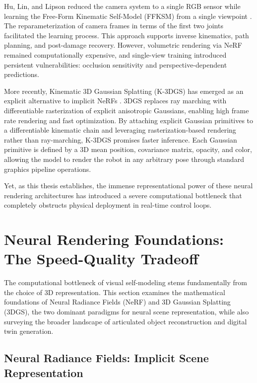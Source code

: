 \documentclass[12pt,a4paper,oneside]{report}
\begin{document}
Hu, Lin, and Lipson reduced the camera system to a single RGB sensor while learning the Free-Form Kinematic Self-Model (FFKSM) from a single viewpoint \cite{hu2024teaching}. The reparameterization of camera frames in terms of the first two joints facilitated the learning process. This approach supports inverse kinematics, path planning, and post-damage recovery. However, volumetric rendering via NeRF remained computationally expensive, and single-view training introduced persistent vulnerabilities: occlusion sensitivity and perspective-dependent predictions.

More recently, Kinematic 3D Gaussian Splatting (K-3DGS) has emerged as an explicit alternative to implicit NeRFs \cite{hu2025learning}. 3DGS replaces ray marching with differentiable rasterization of explicit anisotropic Gaussians, enabling high frame rate rendering and fast optimization. By attaching explicit Gaussian primitives to a differentiable kinematic chain and leveraging rasterization-based rendering rather than ray-marching, K-3DGS promises faster inference. Each Gaussian primitive is defined by a 3D mean position, covariance matrix, opacity, and color, allowing the model to render the robot in any arbitrary pose through standard graphics pipeline operations.

Yet, as this thesis establishes, the immense representational power of these neural rendering architectures has introduced a severe computational bottleneck that completely obstructs physical deployment in real-time control loops.

\section{Neural Rendering Foundations: The Speed-Quality Tradeoff}

The computational bottleneck of visual self-modeling stems fundamentally from the choice of 3D representation. This section examines the mathematical foundations of Neural Radiance Fields (NeRF) and 3D Gaussian Splatting (3DGS), the two dominant paradigms for neural scene representation, while also surveying the broader landscape of articulated object reconstruction and digital twin generation.

\subsection{Neural Radiance Fields: Implicit Scene Representation}
\label{subsec:neural_radiance_fields_implicit_scene_representation}
\end{document}
